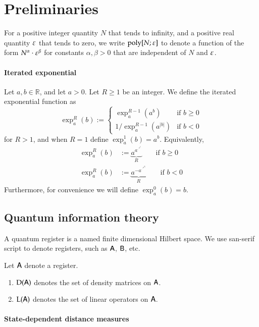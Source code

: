 

\section{Preliminaries}

For a positive integer quantity $N$ that tends to infinity, and a positive real quantity $\varepsilon$ that tends to zero, we write $\operatorname{poly}[N;\varepsilon]$ to denote a function of the form $N^\alpha \cdot \varepsilon^\beta$ for constants $\alpha, \beta > 0$ that are independent of $N$ and $\varepsilon$.

\paragraph{Iterated exponential}
Let $a,b \in \mathbb{R}$, and let $a > 0$. Let $R \geq 1$ be an integer. We define the iterated exponential function as
\[
	\exp^R_a(b) := 
	\left \{ \begin{array}{ll}
		\exp^{R-1}_a(a^b)	& \mbox{if } b \geq 0 \\
		1/\exp^{R-1}_a(a^{|b|}) & \mbox {if } b < 0
	\end{array}
	\right.
\]
for $R > 1$, and when $R=1$ define $\exp^1_a(b) = a^b$. Equivalently, 
\begin{align*}
	\exp^R_a(b) &:= \underbrace{a^{a^{\cdot^{\cdot^{a^b}}}}}_{R} \qquad \mbox{if } b \geq 0 \\
	\exp^R_a(b) &:= \underbrace{a^{-a^{\cdot^{\cdot^{a^{|b|}}}}}}_{R} \qquad \mbox{if } b < 0
\end{align*}
Furthermore, for convenience we will define $\exp^0_a(b) = b$.%

\subsection{Quantum information theory}

A quantum register is a named finite dimensional Hilbert space. We use san-serif script to denote registers, such as ${\mathsf{A}}$, ${\mathsf{B}}$, etc. 

Let ${\mathsf{A}}$ denote a register.
\begin{enumerate}
	\item $\mathrm{D}({\mathsf{A}})$ denotes the set of density matrices on ${\mathsf{A}}$.
	\item $\mathrm{L}({\mathsf{A}})$ denotes the set of linear operators on ${\mathsf{A}}$.
\end{enumerate}


\paragraph{State-dependent distance measures}

